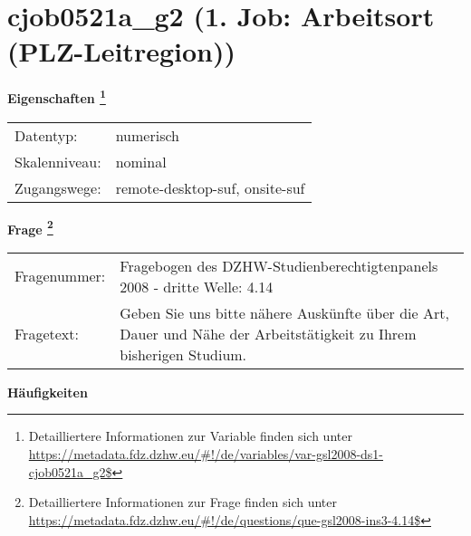 
    \setcounter{footnote}{0}

    \vspace*{-1.8cm}
	\section{cjob0521a\_g2 (1. Job: Arbeitsort (PLZ-Leitregion))}
	\label{section:cjob0521a_g2}



    \vspace*{0.5cm}
    \noindent\textbf{Eigenschaften
	\footnote{Detailliertere Informationen zur Variable finden sich unter
		\url{https://metadata.fdz.dzhw.eu/\#!/de/variables/var-gsl2008-ds1-cjob0521a_g2$}}}\\
	\begin{tabularx}{\hsize}{@{}lX}
	Datentyp: & numerisch \\
	Skalenniveau: & nominal \\
	Zugangswege: &
	  remote-desktop-suf, 
	  onsite-suf
 \\
    \end{tabularx}



				\vspace*{0.5cm}
                \noindent\textbf{Frage
	                \footnote{Detailliertere Informationen zur Frage finden sich unter
		              \url{https://metadata.fdz.dzhw.eu/\#!/de/questions/que-gsl2008-ins3-4.14$}}}\\
				\begin{tabularx}{\hsize}{@{}lX}
					Fragenummer: &
					  Fragebogen des DZHW-Studienberechtigtenpanels 2008 - dritte Welle:
					  4.14
 \\
					Fragetext: & Geben Sie uns bitte nähere Auskünfte über die Art, Dauer und Nähe der Arbeitstätigkeit zu Ihrem bisherigen Studium. \\
				\end{tabularx}





        		\vspace*{0.5cm}
                \noindent\textbf{Häufigkeiten}

